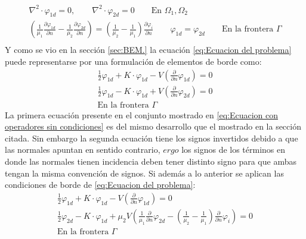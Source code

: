 \documentclass[11pt]{article}
\begin{document}
\begin{equation}
\label{eq:Ecuacion del problema}
\boxed{
\begin{gathered}
\nabla^2\cdot \varphi_{1d}=0,\qquad\nabla^2\cdot \varphi_{2d}=0\qquad\text{En }\Omega_1,\Omega_2\\
\left(\frac{1}{\mu_1}\frac{\partial \varphi_{1d}}{\partial n}-\frac{1}{\mu_2}\frac{\partial \varphi_{2d}}{\partial n}\right)=\left(\frac{1}{\mu_2}-\frac{1}{\mu_1}\right)\frac{\partial \varphi_{i}}{\partial n}\qquad\varphi_{1d}=\varphi_{2d}\qquad\text{En la frontera }\Gamma\\
\end{gathered}
}
\end{equation}
Y como se vio en la sección \ref{sec:BEM.} la ecuación \eqref{eq:Ecuacion del problema} puede representarse por una formulación de elementos de borde como:
\begin{equation}
\label{eq:Ecuacion con operadores sin condiciones}
\begin{gathered}
\frac{1}{2}\varphi_{1d}+K\cdot\varphi_{1d}-V\left(\frac{\partial}{\partial n}\varphi_{1d}\right)=0\\
\frac{1}{2}\varphi_{1d}-K\cdot\varphi_{1d}+V\left(\frac{\partial}{\partial n}\varphi_{2d}\right)=0\\
\text{En la frontera }\Gamma
\end{gathered}
\end{equation}
La primera ecuación presente en el conjunto mostrado en \eqref{eq:Ecuacion con operadores sin condiciones} es del mismo desarrollo que el mostrado en la sección citada. Sin embargo la segunda ecuación tiene los signos invertidos debido a que las normales apuntan en sentido contrario, $ergo$ los signos de los términos en donde las normales tienen incidencia deben tener distinto signo para que ambas tengan la misma convención de signos. Si además a lo anterior se aplican las condiciones de borde de \eqref{eq:Ecuacion del problema}:
\begin{equation}
\label{eq:Ecuacion de borde con condiciones de borde}
\begin{gathered}
\frac{1}{2}\varphi_{1d}+K\cdot\varphi_{1d}-V\left(\frac{\partial}{\partial n}\varphi_{1d}\right)=0\\
\frac{1}{2}\varphi_{2d}-K\cdot\varphi_{1d}+\mu_2 V\left(\frac{1}{\mu_1}\frac{\partial}{\partial n}\varphi_{2d}-\left(\frac{1}{\mu_2}-\frac{1}{\mu_1}\right)\frac{\partial}{\partial n}\varphi_{i}\right)=0\\
\text{En la frontera }\Gamma
\end{gathered}
\end{equation}
\end{document}
